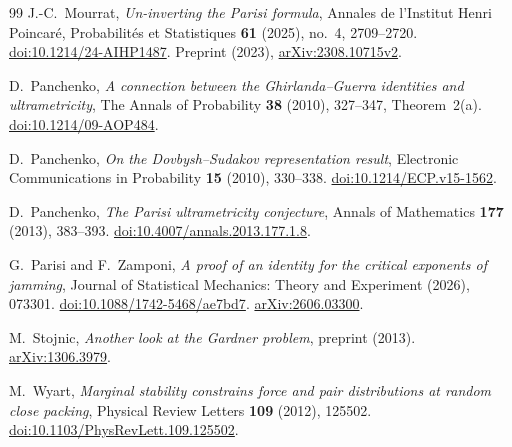 \documentclass[11pt,a4paper]{article}
\numberwithin{equation}{section}
\theoremstyle{definition}
\theoremstyle{remark}
\begin{document}
\begin{thebibliography}{99}
J.-C.~Mourrat,
\emph{Un-inverting the Parisi formula},
Annales de l'Institut Henri Poincar\'e, Probabilit\'es et Statistiques
\textbf{61} (2025), no.~4, 2709--2720.
\href{https://doi.org/10.1214/24-AIHP1487}{doi:10.1214/24-AIHP1487}.
Preprint (2023),
\href{https://arxiv.org/abs/2308.10715v2}{arXiv:2308.10715v2}.

D.~Panchenko,
\emph{A connection between the Ghirlanda--Guerra identities and ultrametricity},
The Annals of Probability \textbf{38} (2010), 327--347, Theorem~2(a).
\href{https://doi.org/10.1214/09-AOP484}{doi:10.1214/09-AOP484}.

D.~Panchenko,
\emph{On the Dovbysh--Sudakov representation result},
Electronic Communications in Probability \textbf{15} (2010), 330--338.
\href{https://doi.org/10.1214/ECP.v15-1562}{doi:10.1214/ECP.v15-1562}.

D.~Panchenko,
\emph{The Parisi ultrametricity conjecture},
Annals of Mathematics \textbf{177} (2013), 383--393.
\href{https://doi.org/10.4007/annals.2013.177.1.8}{doi:10.4007/annals.2013.177.1.8}.

G.~Parisi and F.~Zamponi,
\emph{A proof of an identity for the critical exponents of jamming},
Journal of Statistical Mechanics: Theory and Experiment (2026), 073301.
\href{https://doi.org/10.1088/1742-5468/ae7bd7}{doi:10.1088/1742-5468/ae7bd7}.
\href{https://arxiv.org/abs/2606.03300}{arXiv:2606.03300}.

M.~Stojnic,
\emph{Another look at the Gardner problem},
preprint (2013).
\href{https://arxiv.org/abs/1306.3979}{arXiv:1306.3979}.

M.~Wyart,
\emph{Marginal stability constrains force and pair distributions at random close packing},
Physical Review Letters \textbf{109} (2012), 125502.
\href{https://doi.org/10.1103/PhysRevLett.109.125502}{doi:10.1103/PhysRevLett.109.125502}.

\end{thebibliography}


\appendix
\end{document}

